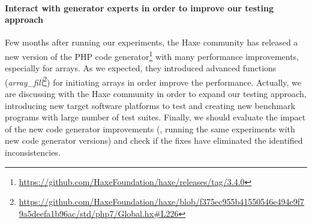 \paragraph{Interact with generator experts in order to improve our testing approach}
Few months after running our experiments, the Haxe community has released a new version of the PHP code generator\footnote{\url{https://github.com/HaxeFoundation/haxe/releases/tag/3.4.0}} with many performance improvements, especially for arrays. As we expected, they introduced advanced functions (\textit{array\_fill}\footnote{\url{https://github.com/HaxeFoundation/haxe/blob/f375ec955b41550546e494e9f79a5deefa1b96ac/std/php7/Global.hx\#L226}}) for initiating arrays in order improve the performance. Actually, we are discussing with the Haxe community in order to expand our testing approach, introducing new target software platforms to test and creating new benchmark programs with large number of test suites. Finally, we should evaluate the impact of the new code generator improvements (\ie, running the same experiments with new code generator versions) and check if the fixes have eliminated the identified inconsistencies.


